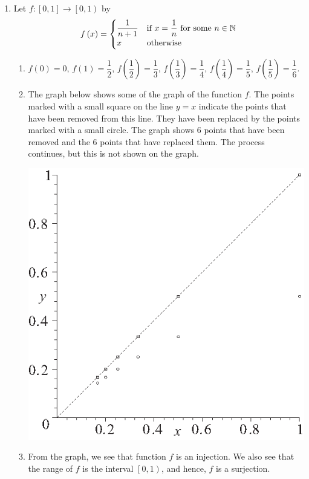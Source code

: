 \documentclass[11pt]{article}
\begin{document}
\begin{enumerate}
\item Let $f: \left[ 0, 1 \right] \to \left[ 0, 1 \right)$ by
\begin{equation} \notag
f \left( x \right) = 
\begin{cases}
\dfrac{1}{n+1}         &\text{if $x=\dfrac{1}{n}$ for some $n \in \mathbb{N}$} \\
x        &\text{otherwise}
\end{cases}
\end{equation}
\begin{enumerate}
\item 
$f \left( 0 \right) = 0$,
$f \left( 1 \right) = \dfrac{1}{2}$, 
$f \left( \dfrac{1}{2} \right) = \dfrac{1}{3}$, 
$f \left( \dfrac{1}{3} \right) = \dfrac{1}{4}$, 
$f \left( \dfrac{1}{4} \right) = \dfrac{1}{5}$,
$f \left( \dfrac{1}{5} \right) = \dfrac{1}{6}$.

\item The graph below shows some of the graph of the function $f$.  The points marked with a small square on the line $y = x$ indicate the points that have been removed from this line.  They have been replaced by the points marked with a small circle.  The graph shows 6 points that have been removed and the 6 points that have replaced them.  The process continues, but this is not shown on the graph.
%
\begin{center}
\includegraphics{figps-sec93-1.eps}
\end{center}
%
\item From the graph, we see that function $f$ is an injection.  We also see that the range of 
$f$ is the interval $\left[ 0, 1 \right)$, and hence, $f$ is a surjection.  


\end{enumerate}
\end{enumerate}
\end{document}
